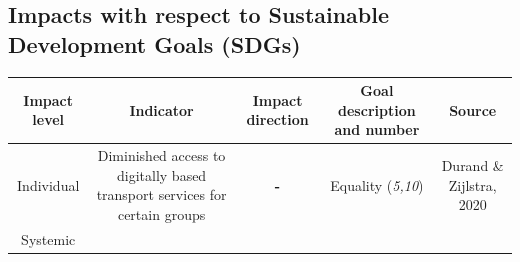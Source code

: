 \documentclass[
]{book}
\begin{document}
\hypertarget{impacts-with-respect-to-sustainable-development-goals-sdgs-5}{%
\subsection*{Impacts with respect to Sustainable Development Goals (SDGs)}\label{impacts-with-respect-to-sustainable-development-goals-sdgs-5}}

\begin{longtable}[]{@{}ccccc@{}}
\toprule
\begin{minipage}[b]{0.17\columnwidth}\centering
Impact level\strut
\end{minipage} & \begin{minipage}[b]{0.16\columnwidth}\centering
Indicator\strut
\end{minipage} & \begin{minipage}[b]{0.17\columnwidth}\centering
Impact direction\strut
\end{minipage} & \begin{minipage}[b]{0.17\columnwidth}\centering
Goal description and number\strut
\end{minipage} & \begin{minipage}[b]{0.17\columnwidth}\centering
Source\strut
\end{minipage}\tabularnewline
\midrule
\endhead
\begin{minipage}[t]{0.17\columnwidth}\centering
Individual\strut
\end{minipage} & \begin{minipage}[t]{0.16\columnwidth}\centering
Diminished access to digitally based transport services for certain groups\strut
\end{minipage} & \begin{minipage}[t]{0.17\columnwidth}\centering
\textbf{-}\strut
\end{minipage} & \begin{minipage}[t]{0.17\columnwidth}\centering
Equality (\emph{5,10})\strut
\end{minipage} & \begin{minipage}[t]{0.17\columnwidth}\centering
Durand \& Zijlstra, 2020\strut
\end{minipage}\tabularnewline
\begin{minipage}[t]{0.17\columnwidth}\centering
Systemic\strut
\end{minipage} & \begin{minipage}[t]{0.16\columnwidth}\centering

\end{minipage}
\end{longtable}
\end{document}
